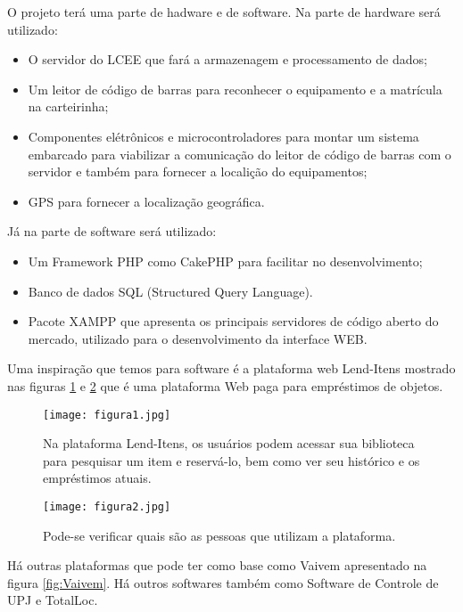 \vspace{-42pt}

O projeto terá uma parte de hadware e de software. Na parte de hardware será utilizado:
\begin{itemize}
   \item O servidor do LCEE que fará a armazenagem e processamento de dados; 
   \item Um leitor de código de barras para reconhecer o equipamento e a matrícula na carteirinha;
   \item Componentes elétrônicos e microcontroladores para montar um sistema embarcado para viabilizar a comunicação do leitor de código de barras com o servidor e também para fornecer a localição do equipamentos;
   \item GPS para fornecer a localização geográfica.
\end{itemize}
Já na parte de software será utilizado:
\begin{itemize}
   \item Um Framework PHP como CakePHP para facilitar no desenvolvimento; 
   \item Banco de dados SQL (Structured Query Language).
   \item Pacote XAMPP que apresenta os principais servidores de código aberto do mercado, utilizado para o desenvolvimento da interface WEB.
\end{itemize}

Uma inspiração que temos para software é a plataforma web Lend-Itens mostrado nas figuras \ref{fig:Lend-Itens1} e \ref{fig:Lend-Itens2} que é uma plataforma Web paga para empréstimos de objetos.

\begin{figure}[!h]
	\centering
	\caption{Na plataforma Lend-Itens, os usuários podem acessar sua biblioteca para pesquisar um item e reservá-lo, bem como ver seu histórico e os empréstimos atuais.}
	\texttt{[image: figura1.jpg]}
	\label{fig:Lend-Itens1}
\end{figure}

\begin{figure}[!h]
	\centering
	\caption{Pode-se verificar quais são as pessoas que utilizam a plataforma.}
	\texttt{[image: figura2.jpg]}
	\label{fig:Lend-Itens2}
\end{figure}

Há outras plataformas que pode ter como base como Vaivem apresentado na figura \ref{fig:Vaivem}. Há outros softwares também como Software de Controle de UPJ e TotalLoc.

